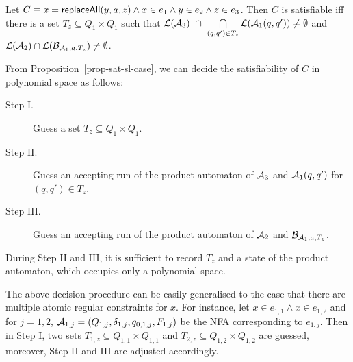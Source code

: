 \begin{proposition}\label{prop-sat-sl-case}
Let $C \equiv x = \mathsf{replaceAll}(y, a, z) \wedge x \in e_1 \wedge y \in e_2 \wedge z \in e_3$. Then $C$ is satisfiable iff there is a set $T_{z} \subseteq Q_1 \times Q_1$ such that $\mathcal{L}(\mathcal{A}_3)\ \cap\ \bigcap \limits_{(q, q') \in T_z} \mathcal{L}(\mathcal{A}_1(q, q')) \neq \emptyset$ and $ \mathcal{L}(\mathcal{A}_2) \cap \mathcal{L}(\mathcal{B}_{\mathcal{A}_1,a,T_z}) \neq \emptyset$.
\end{proposition}

From Proposition~\ref{prop-sat-sl-case}, we can decide the satisfiability of $C$ in polynomial space as follows: 
\begin{description}
\item[Step I.] Guess a set $T_{z} \subseteq Q_1 \times Q_1$. 
%
\item[Step II.] Guess an accepting run of the product automaton of $\mathcal{A}_3$ and $\mathcal{A}_1(q, q')$ for $(q,q') \in T_{z}$. 
%
\item[Step III.] Guess an accepting run of the product automaton of $\mathcal{A}_2$ and $\mathcal{B}_{\mathcal{A}_1, a,  T_{z}}$. 
\end{description}
During Step II and III, it is sufficient to record $T_z$ and a state of the product automaton, which occupies only a polynomial space.

The above decision procedure can be easily generalised to the case that there are multiple atomic regular constraints for $x$. For instance, let $x \in e_{1,1} \wedge x \in e_{1,2}$ and for $j = 1, 2$, $\mathcal{A}_{1,j} = (Q_{1,j}, \delta_{1, j}, q_{0,1, j}, F_{1,j})$ be 
the NFA corresponding to $e_{1,j}$. Then in Step I, two sets $T_{1,z} \subseteq Q_{1,1} \times Q_{1,1}$ and $T_{2,z} \subseteq Q_{1,2} \times Q_{1,2}$ are guessed, moreover, Step II and III are adjusted accordingly.

